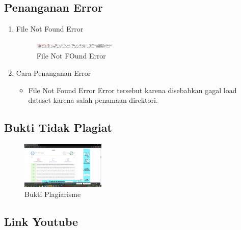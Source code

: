 \subsection{Penanganan Error}
\begin{enumerate}
	\item File Not Found Error
	\begin{figure}[H]
		\includegraphics[width=4cm]{figures/1174054/9/error.png}
		\centering
		\caption{File Not FOund Error}
	\end{figure}

	\item Cara Penanganan Error
	\begin{itemize}
		\item File Not Found Error
		\hfill\break
		Error tersebut karena disebabkan gagal load dataset karena salah penamaan direktori.
	\end{itemize}
\end{enumerate}

\subsection{Bukti Tidak Plagiat}
\begin{figure}[H]
	\includegraphics[width=4cm]{figures/1174054/9/plagiarisme.png}
	\centering
	\caption{Bukti Plagiarisme}
\end{figure}

\subsection{Link Youtube}